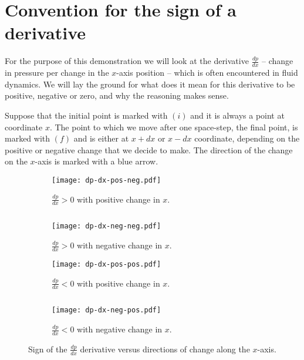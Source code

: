 


\section{Convention for the sign of a derivative}

For the purpose of this demonstration we will look at the derivative $\frac{dp}{dx}$ -- change in pressure per change in the $x$-axis position -- which is often encountered in fluid dynamics. We will lay the ground for what does it mean for this derivative to be positive, negative or zero, and why the reasoning makes sense.

Suppose that the initial point is marked with \textcolor{myblue}{$(i)$} and it is always a point at coordinate $x$. The point to which we move after one space-step, the final point, is marked with \textcolor{myblue}{$(f)$} and is either at $x+dx$ or $x - dx$ coordinate, depending on the positive or negative change that we decide to make. The direction of the change on the $x$-axis is marked with a blue arrow.

\begin{figure}[H]
\begin{subfigure}[t]{.46\textwidth}
\centering
\texttt{[image: dp-dx-pos-neg.pdf]}
\caption{$\frac{dp}{dx} > 0$ with positive change in $x$.}
\end{subfigure}
\begin{minipage}[t]{.07\textwidth}
$ $
\vspace*{1.5cm}
\end{minipage}
\begin{subfigure}[t]{.46\textwidth}
\centering
\texttt{[image: dp-dx-neg-neg.pdf]}
\caption{$\frac{dp}{dx} > 0$ with negative change in $x$.}
\end{subfigure}
\begin{subfigure}[t]{.46\textwidth}
\centering
\texttt{[image: dp-dx-pos-pos.pdf]}
\caption{$\frac{dp}{dx} < 0$ with positive change in $x$.}
\end{subfigure}
\begin{minipage}[t]{.08\textwidth}
$ $
\end{minipage}
\begin{subfigure}[t]{.46\textwidth}
\centering
\texttt{[image: dp-dx-neg-pos.pdf]}
\caption{$\frac{dp}{dx} < 0$ with negative change in $x$.}
\end{subfigure}
\caption{Sign of the $\frac{dp}{dx}$ derivative versus directions of change along the $x$-axis.}
\label{fig:dp-dx-signs}
\end{figure}

